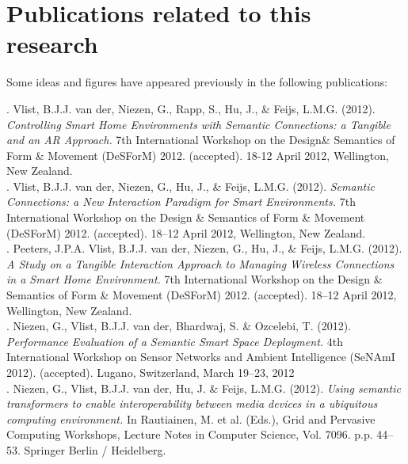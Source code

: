 \cleardoublepage
\chapter*{Publications related to this research}

Some ideas and figures have appeared previously in the following publications:

\bigskip

. Vlist, B.J.J. van der, Niezen, G., Rapp, S., Hu, J., \& Feijs, L.M.G. (2012). \emph{Controlling Smart Home Environments with Semantic Connections: a Tangible and an AR Approach.} 7th International Workshop on the Design\& Semantics of Form \& Movement (DeSForM) 2012. (accepted). 18-12 April 2012, Wellington, New Zealand.\\

. Vlist, B.J.J. van der, Niezen, G., Hu, J., \& Feijs, L.M.G. (2012). \emph{Semantic Connections: a New Interaction Paradigm for Smart Environments.} 7th International Workshop on the Design \& Semantics of Form \& Movement (DeSForM) 2012. (accepted). 18--12 April 2012, Wellington, New Zealand.\\

. Peeters, J.P.A. Vlist, B.J.J. van der, Niezen, G., Hu, J., \& Feijs, L.M.G. (2012). \emph{A Study on a Tangible Interaction Approach to Managing Wireless Connections in a Smart Home Environment.} 7th International Workshop on the Design \& Semantics of Form \& Movement (DeSForM) 2012. (accepted). 18--12 April 2012, Wellington, New Zealand.\\

. Niezen, G., Vlist, B.J.J. van der, Bhardwaj, S. \& Ozcelebi, T. (2012). \emph{Performance Evaluation of a Semantic Smart Space Deployment.} 4th International Workshop on Sensor Networks and Ambient Intelligence (SeNAmI 2012). (accepted). Lugano, Switzerland, March 19--23, 2012\\

. Niezen, G., Vlist, B.J.J. van der, Hu, J. \& Feijs, L.M.G. (2012). \emph{Using semantic transformers to enable interoperability between media devices in a ubiquitous computing environment.} In Rautiainen, M. et al. (Eds.), Grid and Pervasive Computing Workshops, Lecture Notes in Computer Science, Vol. 7096. p.p. 44--53. Springer Berlin / Heidelberg.\\

